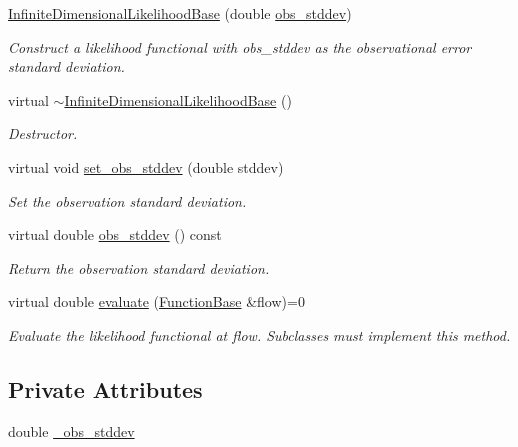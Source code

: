 \begin{DoxyCompactItemize}
\item 
\hyperlink{class_q_u_e_s_o_1_1_infinite_dimensional_likelihood_base_a6f1c2bc9c09977be76b19e98d949a031}{Infinite\-Dimensional\-Likelihood\-Base} (double \hyperlink{class_q_u_e_s_o_1_1_infinite_dimensional_likelihood_base_a99c973f23406360fee6aad332eade3c1}{obs\-\_\-stddev})
\begin{DoxyCompactList}\small\item\em Construct a likelihood functional with {\ttfamily obs\-\_\-stddev} as the observational error standard deviation. \end{DoxyCompactList}\item 
virtual \hyperlink{class_q_u_e_s_o_1_1_infinite_dimensional_likelihood_base_ac27b56bd19349fc4a44caa9ee3e10af5}{$\sim$\-Infinite\-Dimensional\-Likelihood\-Base} ()
\begin{DoxyCompactList}\small\item\em Destructor. \end{DoxyCompactList}\item 
virtual void \hyperlink{class_q_u_e_s_o_1_1_infinite_dimensional_likelihood_base_a54a923baa674e9ee7282d145a53d1823}{set\-\_\-obs\-\_\-stddev} (double stddev)
\begin{DoxyCompactList}\small\item\em Set the observation standard deviation. \end{DoxyCompactList}\item 
virtual double \hyperlink{class_q_u_e_s_o_1_1_infinite_dimensional_likelihood_base_a99c973f23406360fee6aad332eade3c1}{obs\-\_\-stddev} () const 
\begin{DoxyCompactList}\small\item\em Return the observation standard deviation. \end{DoxyCompactList}\item 
virtual double \hyperlink{class_q_u_e_s_o_1_1_infinite_dimensional_likelihood_base_aa93ddb8c6ccc2f357d5046ffb142be14}{evaluate} (\hyperlink{class_q_u_e_s_o_1_1_function_base}{Function\-Base} \&flow)=0
\begin{DoxyCompactList}\small\item\em Evaluate the likelihood functional at {\ttfamily flow}. Subclasses must implement this method. \end{DoxyCompactList}\end{DoxyCompactItemize}
\subsection*{Private Attributes}
\begin{DoxyCompactItemize}
\item 
double \hyperlink{class_q_u_e_s_o_1_1_infinite_dimensional_likelihood_base_aa98ee3e521c8ab194c091f64257e7423}{\-\_\-obs\-\_\-stddev}
\end{DoxyCompactItemize}


